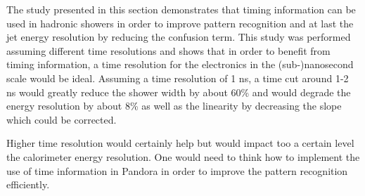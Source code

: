 The study presented in this section demonstrates that timing information can be used in hadronic showers in order to improve pattern recognition and at last the jet energy resolution by reducing the confusion term. This study was performed assuming different time resolutions and shows that in order to benefit from timing information, a time resolution for the electronics in the (sub-)nanosecond scale would be ideal. Assuming a time resolution of 1 ns, a time cut around 1-2 ns would greatly reduce the shower width by about 60\% and would degrade the energy resolution by about 8\% as well as the linearity by decreasing the slope which could be corrected.

Higher time resolution would certainly help but would impact too a certain level the calorimeter energy resolution. One would need to think how to implement the use of time information in Pandora in order to improve the pattern recognition efficiently.
